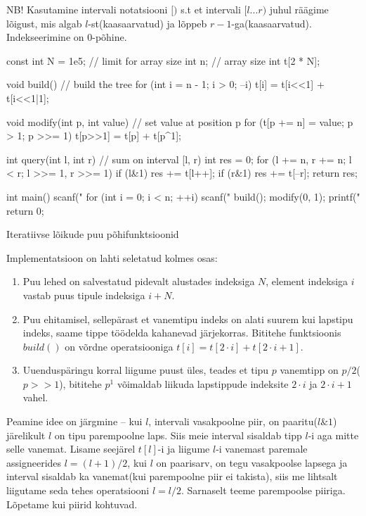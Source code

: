 \documentclass{trkut}
\theoremstyle{definition}
\begin{document}
NB! Kasutamine intervali notatsiooni $[)$ s.t et intervali $[l...r)$ juhul räägime lõigust, mis algab $l$-st(kaasaarvatud) ja lõppeb $r-1$-ga(kaasaarvatud). Indekseerimine on 0-põhine.

\begin{cclol}
const int N = 1e5;  // limit for array size
int n;  // array size
int t[2 * N];

void build() {  // build the tree
  for (int i = n - 1; i > 0; --i) t[i] = t[i<<1] + t[i<<1|1];
}

void modify(int p, int value) {  // set value at position p
  for (t[p += n] = value; p > 1; p >>= 1) t[p>>1] = t[p] + t[p^1];
}

int query(int l, int r) {  // sum on interval [l, r)
  int res = 0;
  for (l += n, r += n; l < r; l >>= 1, r >>= 1) {
    if (l&1) res += t[l++];
    if (r&1) res += t[--r];
  }
  return res;
}

int main() {
  scanf("%
  for (int i = 0; i < n; ++i) scanf("%
  build();
  modify(0, 1);
  printf("%
  return 0;
}
\end{cclol}
 \begin{kk}[H]%
    \caption{Iteratiivse lõikude puu põhifunktsioonid}%
    \label{cfpuu}%
    \end{kk}

Implementatsioon on lahti seletatud kolmes osas:
\begin{enumerate}
    \item Puu lehed on salvestatud pidevalt alustades indeksiga $N$, element indeksiga $i$ vastab puus tipule indeksiga $i+N$.
    \item Puu ehitamisel, sellepärast et vanemtipu indeks on alati suurem kui lapstipu indeks, saame tippe töödelda kahanevad järjekorras. Bititehe funktsioonis $build()$ on võrdne operatsiooniga $t[i] = t[2\cdot i] + t[2\cdot i+1]$.
    \item Uuenduspäringu korral liigume puust üles, teades et tipu $p$ vanemtipp on $p/2$($p>>1$), bititehe $p^1$ võimaldab liikuda lapstippude indeksite $2\cdot i$ ja $2\cdot i+1$ vahel.
\end{enumerate}
\parencite{cfpuu}

Peamine idee on järgmine -- kui $l$, intervali vasakpoolne piir, on paaritu($l\&1$) järelikult $l$ on tipu parempoolne laps. Siis meie interval sisaldab tipp $l$-i aga mitte selle vanemat. Lisame seejärel $t[l]$-i ja liigume $l$-i vanemast paremale assigneerides $l=(l+1)/2$, kui $l$ on paarisarv, on tegu vasakpoolse lapsega ja interval sisaldab ka vanemat(kui parempoolne piir ei takista), siis me lihtsalt liigutame seda tehes operatsiooni $l=l/2$. Sarnaselt teeme parempoolse piiriga. Lõpetame kui piirid kohtuvad. \parencite{cfpuu}
\end{document}
